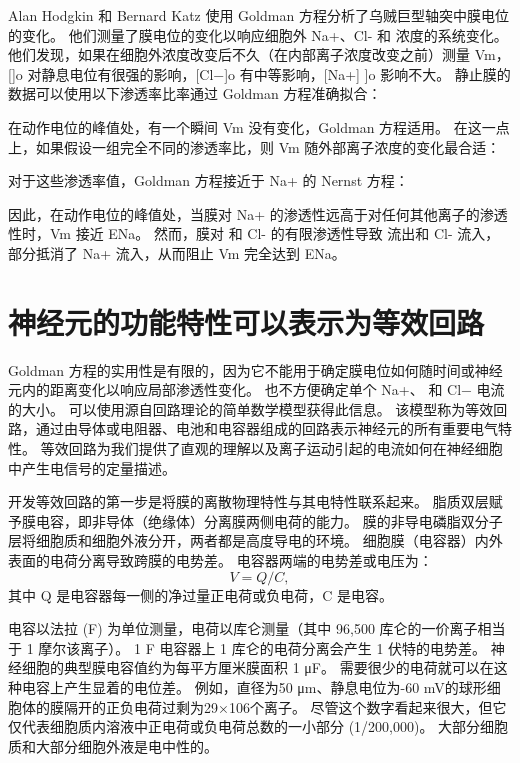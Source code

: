 Alan Hodgkin 和 Bernard Katz 使用 Goldman 方程分析了乌贼巨型轴突中膜电位的变化。 
他们测量了膜电位的变化以响应细胞外 Na+、Cl- 和  浓度的系统变化。 
他们发现，如果在细胞外浓度改变后不久（在内部离子浓度改变之前）测量 Vm，[]o 对静息电位有很强的影响，[Cl−]o 有中等影响，[Na+] ]o 影响不大。 
静止膜的数据可以使用以下渗透率比率通过 Goldman 方程准确拟合：


在动作电位的峰值处，有一个瞬间 Vm 没有变化，Goldman 方程适用。 
在这一点上，如果假设一组完全不同的渗透率比，则 Vm 随外部离子浓度的变化最合适：


对于这些渗透率值，Goldman 方程接近于 Na+ 的 Nernst 方程：


因此，在动作电位的峰值处，当膜对 Na+ 的渗透性远高于对任何其他离子的渗透性时，Vm 接近 ENa。 
然而，膜对  和 Cl- 的有限渗透性导致  流出和 Cl- 流入，部分抵消了 Na+ 流入，从而阻止 Vm 完全达到 ENa。



\section{神经元的功能特性可以表示为等效回路}

Goldman 方程的实用性是有限的，因为它不能用于确定膜电位如何随时间或神经元内的距离变化以响应局部渗透性变化。
也不方便确定单个 Na+、 和 Cl− 电流的大小。
可以使用源自回路理论的简单数学模型获得此信息。
该模型称为等效回路，通过由导体或电阻器、电池和电容器组成的回路表示神经元的所有重要电气特性。
等效回路为我们提供了直观的理解以及离子运动引起的电流如何在神经细胞中产生电信号的定量描述。


开发等效回路的第一步是将膜的离散物理特性与其电特性联系起来。
脂质双层赋予膜电容，即非导体（绝缘体）分离膜两侧电荷的能力。
膜的非导电磷脂双分子层将细胞质和细胞外液分开，两者都是高度导电的环境。
细胞膜（电容器）内外表面的电荷分离导致跨膜的电势差。
电容器两端的电势差或电压为：
\begin{equation}
	V = Q/C,
\end{equation}
其中 Q 是电容器每一侧的净过量正电荷或负电荷，C 是电容。


电容以法拉 (F) 为单位测量，电荷以库仑测量（其中 96,500 库仑的一价离子相当于 1 摩尔该离子）。
1 F 电容器上 1 库仑的电荷分离会产生 1 伏特的电势差。
神经细胞的典型膜电容值约为每平方厘米膜面积 1 μF。 
需要很少的电荷就可以在这种电容上产生显着的电位差。 
例如，直径为50 μm、静息电位为-60 mV的球形细胞体的膜隔开的正负电荷过剩为29×106个离子。
尽管这个数字看起来很大，但它仅代表细胞质内溶液中正电荷或负电荷总数的一小部分 (1/200,000)。
大部分细胞质和大部分细胞外液是电中性的。


